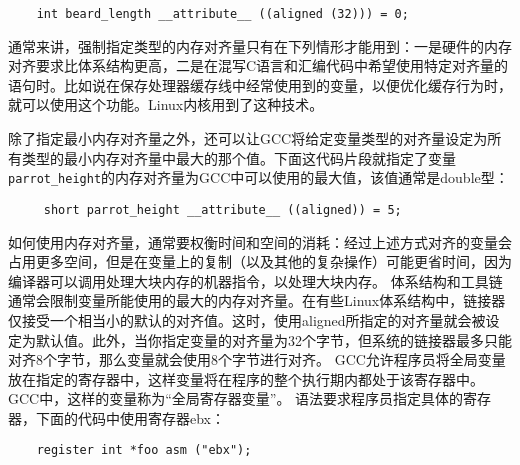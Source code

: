 \begin{lstlisting}
    int beard_length __attribute__ ((aligned (32))) = 0;
\end{lstlisting}
通常来讲，强制指定类型的内存对齐量只有在下列情形才能用到：一是硬件的内存对齐要求比体系结构更高，二是在混写C语言和汇编代码中希望使用特定对齐量的语句时。比如说在保存处理器缓存线中经常使用到的变量，以便优化缓存行为时，就可以使用这个功能。Linux内核用到了这种技术。

除了指定最小内存对齐量之外，还可以让GCC将给定变量类型的对齐量设定为所有类型的最小内存对齐量中最大的那个值。下面这代码片段就指定了变量\verb+parrot_height+的内存对齐量为GCC中可以使用的最大值，该值通常是double型：
\begin{lstlisting}
     short parrot_height __attribute__ ((aligned)) = 5;
\end{lstlisting}
如何使用内存对齐量，通常要权衡时间和空间的消耗：经过上述方式对齐的变量会占用更多空间，但是在变量上的复制（以及其他的复杂操作）可能更省时间，因为编译器可以调用处理大块内存的机器指令，以处理大块内存。
体系结构和工具链通常会限制变量所能使用的最大的内存对齐量。在有些Linux体系结构中，链接器仅接受一个相当小的默认的对齐值。这时，使用aligned所指定的对齐量就会被设定为默认值。此外，当你指定变量的对齐量为32个字节，但系统的链接器最多只能对齐8个字节，那么变量就会使用8个字节进行对齐。
GCC允许程序员将全局变量放在指定的寄存器中，这样变量将在程序的整个执行期内都处于该寄存器中。GCC中，这样的变量称为“全局寄存器变量”。
语法要求程序员指定具体的寄存器，下面的代码中使用寄存器ebx：
\begin{lstlisting}
    register int *foo asm ("ebx");
\end{lstlisting}

